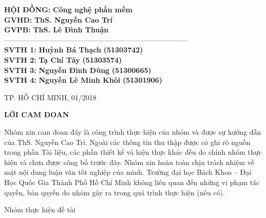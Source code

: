 \documentclass[a4paper,12pt,oneside]{article}
\begin{document}
{\fontsize{15pt}{1}
\begin{tabbing}

\hspace*{3.1cm} \= \textbf{HỘI ĐỒNG:} \hspace*{0.01cm} \= \textbf{Công nghệ phần mềm} \\
\> \textbf{GVHD:} \> \textbf{ThS. Nguyễn Cao Trí}\\
\> \textbf{GVPB:} \> \textbf{ThS. Lê Đình Thuận}\\
\> -----------------------------------------------------------------------------\\
\> \textbf{SVTH 1:} \> \textbf{Huỳnh Bá Thạch} \hspace*{1.2cm} \= \textbf{(51303742)}\\
\> \textbf{SVTH 2:} \> \textbf{Tạ Chí Tây} \> \textbf{(51303574)}\\
\> \textbf{SVTH 3:} \> \textbf{Nguyễn Đình Dũng} \> \textbf{(51300665)}\\
\> \textbf{SVTH 4:} \> \textbf{Nguyễn Lê Minh Khôi} \> \textbf{(51301906)}\\
\end{tabbing}
}

\vspace{\fill}
\begin{center}
{\fontsize{20pt}{1} TP. HỒ CHÍ MINH, 01/2018}\\
\end{center}
\ClearShipoutPicture

\newpage

\begin{center}
{\fontsize{20pt}{1}\selectfont \textbf{LỜI CAM ĐOAN}}\\[1cm]
\end{center}
Nhóm xin cam đoan đây là công trình thực hiện của nhóm và được sự hướng dẫn của ThS. Nguyễn Cao Trí. Ngoài các thông tin thu thập được có ghi rõ nguồn trong phần Tài liệu, các phần thiết kế và hiện thực khác đều do chính nhóm thực hiện và chưa được công bố trước đây. Nhóm xin hoàn toàn chịu trách nhiệm về mặt nội dung luận văn tốt nghiệp của mình. Trường đại học Bách Khoa – Đại Học
Quốc Gia Thành Phố Hồ Chí Minh không liên quan đến những vi phạm tác quyền,
bản quyền do nhóm gây ra trong quá trình thực hiện (nếu có).
\begin{flushright}
Nhóm thực hiện đề tài
\end{flushright}
\end{document}
